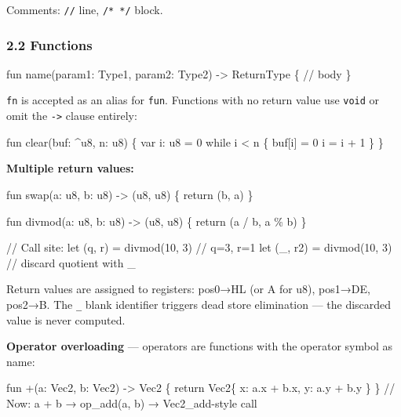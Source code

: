 \documentclass[
  11pt,
]{article}
\newenvironment{Shaded}{}{}
\newcommand{\NormalTok}[1]{#1}
\begin{document}
Comments: \texttt{//} line, \texttt{/*\ */} block.

\subsubsection{2.2 Functions}\label{functions}

\begin{Shaded}
\begin{Highlighting}[]
\NormalTok{fun name(param1: Type1, param2: Type2) {-}\textgreater{} ReturnType \{}
\NormalTok{    // body}
\NormalTok{\}}
\end{Highlighting}
\end{Shaded}

\texttt{fn} is accepted as an alias for \texttt{fun}. Functions with no
return value use \texttt{void} or omit the \texttt{-\textgreater{}}
clause entirely:

\begin{Shaded}
\begin{Highlighting}[]
\NormalTok{fun clear(buf: \^{}u8, n: u8) \{}
\NormalTok{    var i: u8 = 0}
\NormalTok{    while i \textless{} n \{}
\NormalTok{        buf[i] = 0}
\NormalTok{        i = i + 1}
\NormalTok{    \}}
\NormalTok{\}}
\end{Highlighting}
\end{Shaded}

\textbf{Multiple return values:}

\begin{Shaded}
\begin{Highlighting}[]
\NormalTok{fun swap(a: u8, b: u8) {-}\textgreater{} (u8, u8) \{}
\NormalTok{    return (b, a)}
\NormalTok{\}}

\NormalTok{fun divmod(a: u8, b: u8) {-}\textgreater{} (u8, u8) \{}
\NormalTok{    return (a / b, a \% b)}
\NormalTok{\}}

\NormalTok{// Call site:}
\NormalTok{let (q, r) = divmod(10, 3)    // q=3, r=1}
\NormalTok{let (\_, r2) = divmod(10, 3)   // discard quotient with \_}
\end{Highlighting}
\end{Shaded}

Return values are assigned to registers: pos0→HL (or A for u8), pos1→DE,
pos2→B. The \texttt{\_} blank identifier triggers dead store elimination
--- the discarded value is never computed.

\textbf{Operator overloading} --- operators are functions with the
operator symbol as name:

\begin{Shaded}
\begin{Highlighting}[]
\NormalTok{fun +(a: Vec2, b: Vec2) {-}\textgreater{} Vec2 \{}
\NormalTok{    return Vec2\{ x: a.x + b.x, y: a.y + b.y \}}
\NormalTok{\}}
\NormalTok{// Now: a + b → op\_add(a, b) → Vec2\_add{-}style call}
\end{Highlighting}
\end{Shaded}
\end{document}

